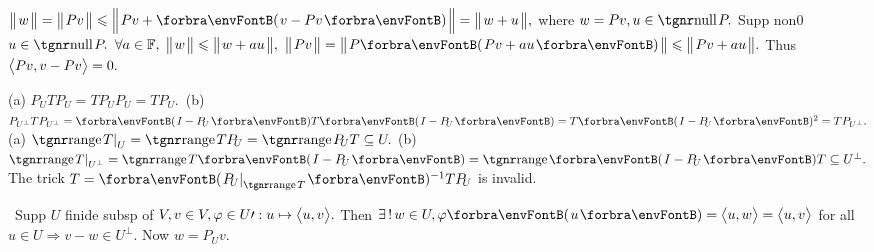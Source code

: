 $\Dvert{w}=\Dvert{Pv}\leqslant\BigDvert{Pv+\Par{v-Pv}}=\Dvert{w+u},$ where $w=Pv,u\in\null P.$ \;Supp non0 $u\in\null P.$\parSol{}
$\forall a\in{\mathbb{F}},\;\big\Vert\hspace{1pt}{}w{}\hspace{1pt}\big\Vert\leqslant\big\Vert\hspace{1pt}{}w+au{}\hspace{1pt}\big\Vert,$ \Or $\Dvert{Pv}=\Dvert{P\Par{Pv+au}}\leqslant\Dvert{Pv+au}.$ \;Thus $\big\langle{}Pv,v-Pv{}\big\rangle=0.$\PfEnd
\SepLine

(a) $P_{\!U}TP_{\!U}=TP_{\!U}P_{\!U}=TP_{\!U}.$ \,(b) $P_{U^\perp}TP_{U^\perp}=\Par{I-P_{\!U}}T\Par{I-P_{\!U}}=T\Par{I-P_{\!U}}{^2}=TP_{U^\perp}.$\vspace{2pt}\PfEnd\parSol{}
\Or (a) $\range T\mmid_U=\range TP_{\!U}=\range P_{\!U}T\subseteq U.$\parSol{}
\Blind{\Or}(b) $\range T\mmid_{U^\perp}=\range T\Par{I-P_{\!U}}=\range\Par{I-P_{\!U}}T\subseteq U^\perp.$\PfEnd\parSol{}
\Blind{\Or}\AComm The trick $T=\Par{P_{\!U}\mmid_{\range T}}{^{-1}}TP_{\!U}$ is invalid.
\SepLine

\BulletPointX{}\,\,\,Supp $U$ finide subsp of $V,v\in V,\varphi\in U\prime:u\mapsto\big\langle{}u,v{}\big\rangle.$\TextB{}
{}Then $\exists\,!\,w\in U,\varphi\Par{u}=\Ang{u,w}=\Ang{u,v}$ for all $u\in U\Rightarrow v-w\in U^\perp.$ Now $w=P_{\!U}v.$
\SepLine


\ChEnd
\vspace{8pt}

\vfill{}%

\vspace{6pt}


